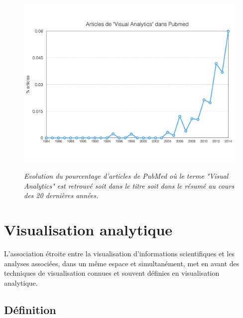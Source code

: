 \begin{figure}
  \centering
  {\includegraphics[width=.75\linewidth]{./figures/ch2/VA_pubmed_trend}}
    \caption{{\it Evolution du pourcentage d'articles de PubMed où le terme "Visual Analytics" est retrouvé soit dans le titre soit dans le résumé au cours des 20 dernières années.}}
  \label{Fig:VA_pubmed_trend}
  \hspace{0.3cm}
\end{figure}


\section{Visualisation analytique}

L'association étroite entre la visualisation d'informations scientifiques et les analyses associées, dans un même espace et simultanément, met en avant des techniques de visualisation connues et souvent définies en visualisation analytique.

\subsection{Définition}


